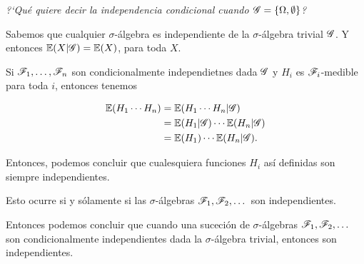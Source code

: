 ﻿\emph{
	?`Qu\'e quiere decir la independencia condicional cuando $\mathscr{G}=\left\{  \Omega ,\emptyset\right\} $?
}
\afterstatement\par\null

Sabemos que cualquier $\sigma$-álgebra es
independiente de la $\sigma$-álgebra trivial $\mathscr{G}$. Y entonces $\mathbb{E}(X | \mathscr{G}) = \mathbb{E}(X)$, para toda $X$.\par\null

Si $\mathscr{F}_1, \dots, \mathscr{F}_n$ son condicionalmente independietnes dada $\mathscr{G}$ y $H_i$ es $\mathscr{F}_i$-medible para toda $i$, entonces tenemos

\begin{align}
    \mathbb{E}(H_1 \cdots H_n) &=  \mathbb{E}(H_1 \cdots H_n | \mathscr{G})            \\
                        &=  \mathbb{E}(H_1 | \mathscr{G}) \cdots \mathbb{E}(H_n | \mathscr{G})    \\
                        &=  \mathbb{E}(H_1) \cdots  \mathbb{E}(H_n | \mathscr{G}).
\end{align}

Entonces, podemos concluir que cualesquiera funciones $H_i$ así definidas son siempre
independientes.\par\null

Esto ocurre si y sólamente si las $\sigma$-álgebras $\mathscr{F}_1, \mathscr{F}_2,\dots$ son independientes.\par\null

Entonces podemos concluir que cuando una suceción de $\sigma$-álgebras $\mathscr{F}_1, \mathscr{F}_2,\dots$ son condicionalmente independientes
dada la $\sigma$-álgebra trivial, entonces son independientes.